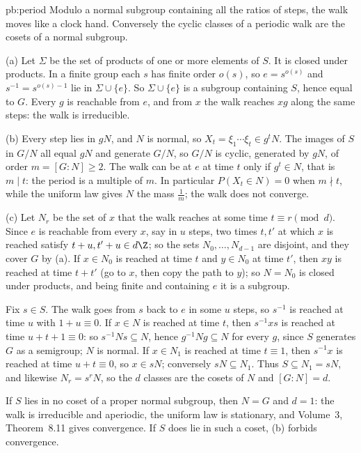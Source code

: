 \begin{solution}{pb:period}
\idea Modulo a normal subgroup containing all the ratios of steps, the walk moves like a clock hand. Conversely the cyclic classes of
a periodic walk are the cosets of a normal subgroup.

\writeup (a) Let $\Sigma$ be the set of products of one or more elements of $S$. It is closed under products. In a finite group each $s$ has finite
order $o(s)$, so $e=s^{o(s)}$ and $s^{-1}=s^{o(s)-1}$ lie in $\Sigma\cup\{e\}$. So $\Sigma\cup\{e\}$ is a subgroup containing $S$, hence equal to $G$. Every $g$ is reachable from $e$,
and from $x$ the walk reaches $xg$ along the same steps: the walk is irreducible.

(b) Every step lies in $gN$, and $N$ is normal, so $X_t=\xi_1\cdots\xi_t\in g^tN$. The images of $S$ in $G/N$ all equal $gN$ and generate $G/N$, so $G/N$ is
cyclic, generated by $gN$, of order $m=[G:N]\ge2$. The walk can be at $e$ at time $t$ only if $g^t\in N$, that is $m\mid t$: the period is a multiple of $m$. In
particular $P(X_t\in N)=0$ when $m\nmid t$, while the uniform law gives $N$ the mass $\frac1m$; the walk does not converge.

(c) Let $N_r$ be the set of $x$ that the walk reaches at some time $t\equiv r\pmod d$. Since $e$ is reachable from every $x$, say in $u$ steps, two times $t,t'$
at which $x$ is reached satisfy $t+u,t'+u\in d\Z$; so the sets $N_0,\dots,N_{d-1}$ are disjoint, and they cover $G$ by (a). If $x\in N_0$ is reached at time $t$ and $y\in N_0$
at time $t'$, then $xy$ is reached at time $t+t'$ (go to $x$, then copy the path to $y$); so $N=N_0$ is closed under products, and being finite and
containing $e$ it is a subgroup.

Fix $s\in S$. The walk goes from $s$ back to $e$ in some $u$ steps, so $s^{-1}$ is reached at time $u$ with $1+u\equiv0$. If $x\in N$ is reached at time $t$, then $s^{-1}xs$
is reached at time $u+t+1\equiv0$: so $s^{-1}Ns\subseteq N$, hence $g^{-1}Ng\subseteq N$ for every $g$, since $S$ generates $G$ as a semigroup; $N$ is normal. If $x\in N_1$ is
reached at time $t\equiv1$, then $s^{-1}x$ is reached at time $u+t\equiv0$, so $x\in sN$; conversely $sN\subseteq N_1$. Thus $S\subseteq N_1=sN$, and likewise $N_r=s^rN$, so the $d$
classes are the cosets of $N$ and $[G:N]=d$.

If $S$ lies in no coset of a proper normal subgroup, then $N=G$ and $d=1$: the walk is irreducible and aperiodic, the uniform law is
stationary, and Volume~3, Theorem~8.11 gives convergence. If $S$ does lie in such a coset, (b) forbids convergence.


\end{solution}
